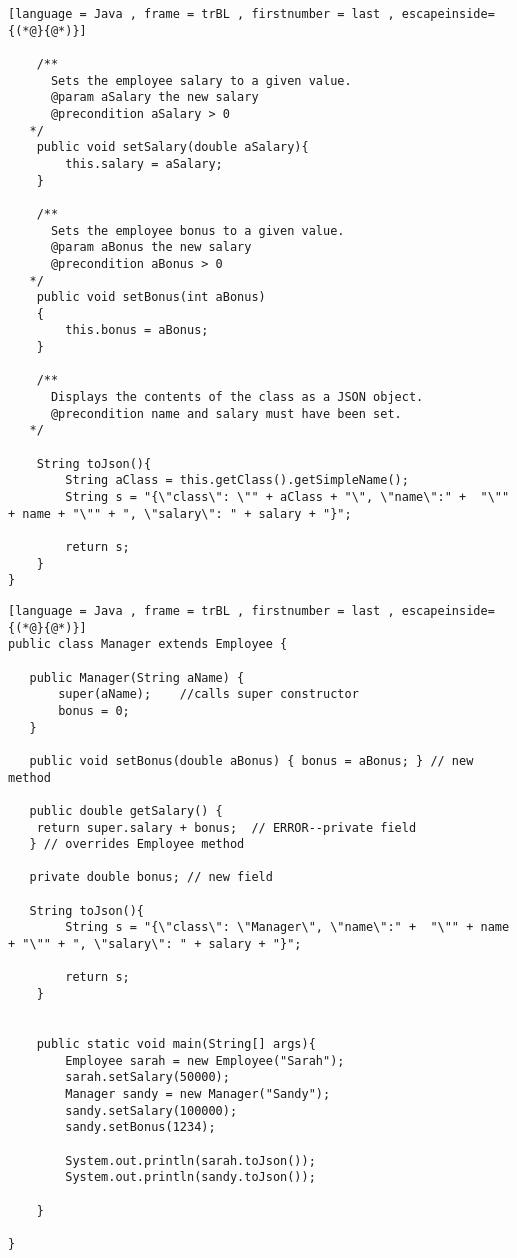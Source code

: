 \begin{enumerate}[label=(\alph*),align=left, wide, labelwidth=!, labelindent=0pt]
\begin{lstlisting}[language = Java , frame = trBL , firstnumber = last , escapeinside={(*@}{@*)}]
    
    /**
      Sets the employee salary to a given value. 
      @param aSalary the new salary 
      @precondition aSalary > 0 
   */ 
    public void setSalary(double aSalary){
        this.salary = aSalary;
    }
    
    /**
      Sets the employee bonus to a given value. 
      @param aBonus the new salary 
      @precondition aBonus > 0 
   */ 
    public void setBonus(int aBonus)
    {
        this.bonus = aBonus;
    }
    
    /**
      Displays the contents of the class as a JSON object. 
      @precondition name and salary must have been set. 
   */ 
    
    String toJson(){
        String aClass = this.getClass().getSimpleName();
        String s = "{\"class\": \"" + aClass + "\", \"name\":" +  "\"" + name + "\"" + ", \"salary\": " + salary + "}";
        
        return s;
    }
}
\end{lstlisting}  		

\begin{lstlisting}[language = Java , frame = trBL , firstnumber = last , escapeinside={(*@}{@*)}]
public class Manager extends Employee {
    
   public Manager(String aName) {
       super(aName);    //calls super constructor
       bonus = 0;
   }
   
   public void setBonus(double aBonus) { bonus = aBonus; } // new method
   
   public double getSalary() { 
    return super.salary + bonus;  // ERROR--private field
   } // overrides Employee method

   private double bonus; // new field
   
   String toJson(){
        String s = "{\"class\": \"Manager\", \"name\":" +  "\"" + name + "\"" + ", \"salary\": " + salary + "}";
        
        return s;
    }
    
    
    public static void main(String[] args){
        Employee sarah = new Employee("Sarah");
        sarah.setSalary(50000);
        Manager sandy = new Manager("Sandy");
        sandy.setSalary(100000);
        sandy.setBonus(1234);
        
        System.out.println(sarah.toJson());
        System.out.println(sandy.toJson());
        
    }

}
\end{lstlisting}  		

\end{enumerate}

